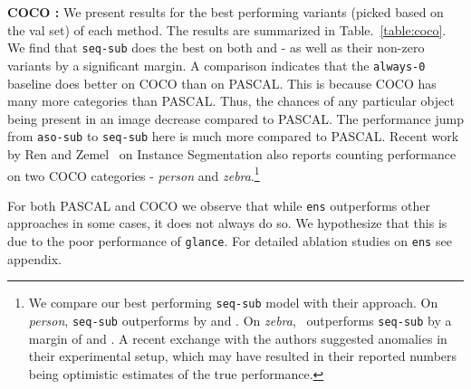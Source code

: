 \documentclass[10pt,twocolumn,letterpaper]{article}
\newcommand{\sub}{\texttt{aso-sub}\xspace}
\newcommand{\seq}{\texttt{seq-sub}\xspace}
\newcommand{\glance}{\texttt{glance}\xspace}
\newcommand{\pascal}{PASCAL\xspace}
\newcommand{\ens}{\texttt{ens}\xspace}
\begin{document}
\textbf{COCO :} We present results for the best performing variants (picked based on the val set) of each method. The results are summarized in Table.~\ref{table:coco}. We find that \seq does the best on both  and - as well as their non-zero variants by a significant margin. A comparison indicates that the \texttt{always-0} baseline does better on COCO than on PASCAL. This is because COCO has many more categories than PASCAL. Thus, the chances of any particular object being present in an image decrease compared to PASCAL. The performance jump from \sub to \seq here is much more compared to \pascal. Recent work by Ren and Zemel~\cite{RenZ16} on Instance Segmentation also reports counting performance on two COCO categories - \textit{person} and \textit{zebra}.\footnote{We compare our best performing \seq model with their approach. On \emph{person}, \seq outperforms by   and  . On \emph{zebra},~\cite{RenZ16} outperforms \seq by a margin of   and  . A recent exchange with the authors suggested anomalies in their experimental setup, which may have resulted in their reported numbers being optimistic estimates of the true performance.}
\par \noindent
For both PASCAL and COCO we observe that while \ens outperforms other approaches in some cases, it does not always do so. We hypothesize that this is due to the poor performance of \glance. For detailed ablation studies on \ens see appendix.
\end{document}
